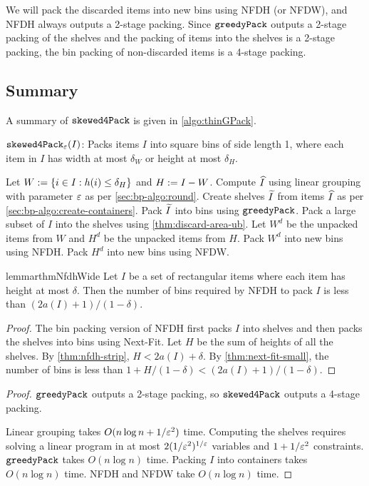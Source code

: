 We will pack the discarded items into new bins using NFDH (or NFDW),
and NFDH always outputs a 2-stage packing.
Since $\operatorname{\mathtt{greedyPack}}$ outputs a 2-stage packing of the shelves
and the packing of items into the shelves is a 2-stage packing,
the bin packing of non-discarded items is a 4-stage packing.

\subsection{Summary}
\label{sec:thin-gpack:summary}

A summary of $\operatorname{\mathtt{skewed4Pack}}$ is given in \cref{algo:thinGPack}.

\begin{algorithm}[!ht]
\caption{$\operatorname{\mathtt{skewed4Pack}}_{\varepsilon}(I)$: Packs items $I$ into square bins of side length 1,
where each item in $I$ has width at most $\delta_W$ or height at most $\delta_H$.}
\label{algo:thinGPack}
\begin{algorithmic}[1]
\State Let $W := \{i \in I: h(i) \le \delta_H\}$ and $H := I - W$.
\State Compute $\widehat{I}$ using linear grouping with parameter $\varepsilon$ as per \cref{sec:bp-algo:round}.
\State Create shelves $\widetilde{I}$ from items $\widehat{I}$ as per \cref{sec:bp-algo:create-containers}.
\State Pack $\widetilde{I}$ into bins using $\operatorname{\mathtt{greedyPack}}$.
\State Pack a large subset of $I$ into the shelves using \cref{thm:discard-area-ub}.
Let $W^d$ be the unpacked items from $W$ and $H^d$ be the unpacked items from $H$.
\State Pack $W^d$ into new bins using NFDH.
\State Pack $H^d$ into new bins using NFDW.
\end{algorithmic}
\end{algorithm}

\begin{restatable}{lemma}{rthmNfdhWide}
\label{thm:nfdh-wide}
Let $I$ be a set of rectangular items where each item has height at most $\delta$.
Then the number of bins required by NFDH to pack $I$ is less than
$(2a(I)+1)/(1-\delta)$.
\end{restatable}
\begin{proof}
The bin packing version of NFDH first packs $I$ into shelves
and then packs the shelves into bins using Next-Fit.
Let $H$ be the sum of heights of all the shelves.
By \cref{thm:nfdh-strip}, $H < 2a(I) + \delta$.
By \cref{thm:next-fit-small}, the number of bins
is less than $1 + H/(1-\delta) < (2a(I)+1)/(1-\delta)$.
\end{proof}

\rthmThinGPackProps*
\begin{proof}
$\operatorname{\mathtt{greedyPack}}$ outputs a 2-stage packing, so $\operatorname{\mathtt{skewed4Pack}}$ outputs a 4-stage packing.

Linear grouping takes $O(n\log n + 1/\varepsilon^2)$ time.
Computing the shelves requires solving a linear program in at most
$2(1/\varepsilon^2)^{1/\varepsilon}$ variables and $1+1/\varepsilon^2$ constraints.
$\operatorname{\mathtt{greedyPack}}$ takes $O(n\log n)$ time.
Packing $I$ into containers takes $O(n\log n)$ time.
NFDH and NFDW take $O(n\log n)$ time.
\end{proof}

